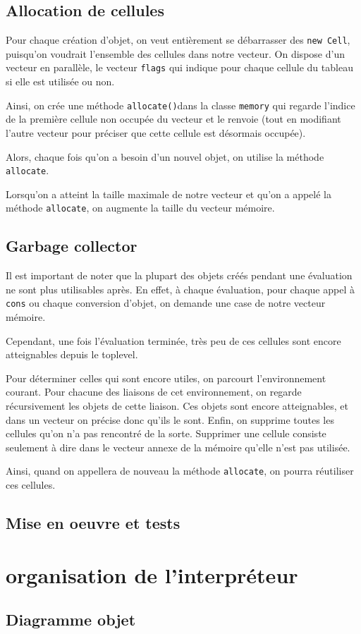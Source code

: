 \documentclass[12pt]{article}
\begin{document}
\subsection{Allocation de cellules}

Pour chaque création d'objet, on veut entièrement se débarrasser des \texttt{new Cell}, puisqu'on voudrait l'ensemble des cellules dans notre vecteur.  On dispose  d'un vecteur en parallèle, le vecteur \texttt{flags} qui indique pour chaque cellule du tableau si elle est utilisée ou non.

Ainsi, on crée une méthode \texttt{allocate()}dans la classe \texttt{memory} qui regarde l'indice de la première cellule non occupée du vecteur et le renvoie (tout en modifiant l'autre vecteur pour préciser que cette cellule est désormais occupée).

Alors, chaque fois qu'on a besoin d'un nouvel objet, on utilise la méthode \texttt{allocate}.

Lorsqu'on a atteint la taille maximale de notre vecteur et qu'on a appelé la méthode \texttt{allocate}, on augmente la taille du vecteur mémoire.

\subsection{Garbage collector}

Il est important de noter que la plupart des objets créés pendant une évaluation ne sont plus utilisables après. En effet, à chaque évaluation, pour chaque appel à \texttt{cons} ou chaque conversion d'objet, on demande une case de notre vecteur mémoire.

Cependant, une fois l'évaluation terminée, très peu de ces cellules sont encore atteignables depuis le toplevel.

Pour déterminer celles qui sont encore utiles, on parcourt l'environnement courant. Pour chacune des liaisons de cet environnement, on regarde récursivement les objets de cette liaison. Ces objets sont encore atteignables, et dans un vecteur on précise donc qu'ils le sont. Enfin, on supprime toutes les cellules qu'on n'a pas rencontré de la sorte. Supprimer une cellule consiste seulement à dire dans le vecteur annexe de la mémoire qu'elle n'est pas utilisée.

Ainsi, quand on appellera de nouveau la méthode \texttt{allocate}, on pourra réutiliser ces cellules.


\subsection{Mise en oeuvre et tests}

\section{organisation de l'interpréteur}

\subsection{Diagramme objet}
\end{document}
